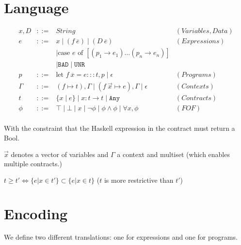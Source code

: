 \documentclass{article}
\begin{document}
\section{Language}

\newcommand{\unr}{\texttt{UNR}}
\newcommand{\bad}{\texttt{BAD}}
\newcommand{\any}{\texttt{Any}}
\newcommand{\ok}{\texttt{Ok}}
\newcommand{\mand}{\mbox{ and }}
\newcommand{\motherwise}{\mbox{ otherwise.}}

\begin{eqnarray*}
  x,D &::=& String & (Variables, Data)\\
  e &::=& x \mid (f~\overline{e}) \mid (D~\overline{e}) & (Expressions) \\
  &&\mid \mbox{case $e$ of } [(p_1 \to e_1) \dots (p_n \to e_n)]   & \\ 
  &&\mid \bad \mid \unr & \\
  p &::=& \mbox{let } f~\overline{x} = e ::: t,p \mid \epsilon & (Programs) \\
  \Gamma &::=& (f \mapsto t),\Gamma \mid (f~\vec{x} \mapsto e), \Gamma \mid \epsilon & (Contexts) \\
  t &::=& \{x \mid e \} \mid x:t \to t \mid \any & (Contracts) \\
  \phi &::=& \top \mid \bot \mid x \mid \lnot \phi \mid \phi \land \phi \mid \forall x, \phi & (FOF) \\
\end{eqnarray*}

With the constraint that the Haskell expression in the contract must return a Bool.

$\vec{x}$ denotes a vector of variables and $\Gamma$ a context and multiset (which enables multiple contracts.)

$t \geq t' \iff \{ e | x \in t' \} \subset \{ e | x \in t \}$ ($t$ is more restrictive than $t'$)
\section{Encoding}

We define two different translations: one for expressions and one for programs. 
\end{document}
